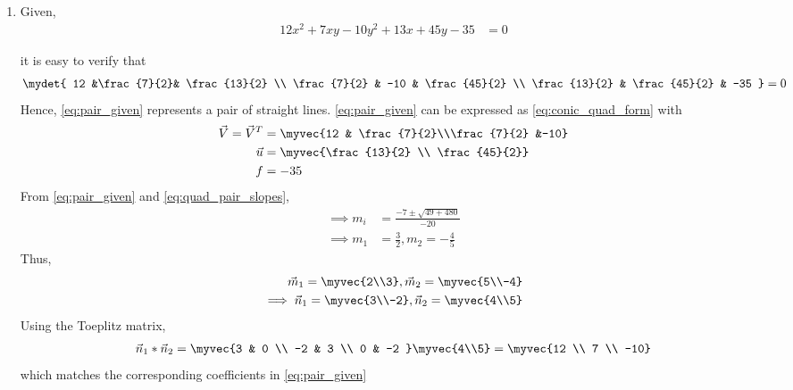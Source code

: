 \renewcommand{\theequation}{\theenumi}
\begin{enumerate}[label=\thesection.\arabic*.,ref=\thesection.\theenumi]

\item 
Given,
\begin{align}
    12x^2+7xy-10y^2+13x+45y-35&=0 
\label{eq:pair_given}
\end{align}

it is easy to verify that
\begin{align}
\mydet{
12 &\frac{7}{2}& \frac{13}{2}
\\
\frac{7}{2} & -10 & \frac{45}{2}
\\ 
\frac{13}{2} & \frac{45}{2} & -35
} = 0
\end{align}
%
Hence, \eqref{eq:pair_given} represents a pair of straight lines.
%
 \eqref{eq:pair_given} can be expressed as \eqref{eq:conic_quad_form} with
\begin{align}
    \vec{V}=\vec{V}^T&=\myvec{12 & \frac{7}{2}\\\frac{7}{2} &-10}\label{eq:pair_v}\\
    \vec{u}&=\myvec{\frac{13}{2} \\ \frac{45}{2}}\label{eq:pair_u}\\
    f&=-35\label{eq:pair_fv}
\end{align}
From \eqref{eq:pair_given} and \eqref{eq:quad_pair_slopes},
\begin{align}
\label{eq:quad_pair_slopes_ex}
\implies m_i &= \frac{-7 \pm \sqrt{49+480}}{-20}
\\
\implies m_1 &=  \frac{3}{2}, m_2 = -\frac{4}{5}
\end{align}
Thus,
\begin{align}
\vec{m}_1 = \myvec{2\\3},
\vec{m}_2 = \myvec{5\\-4}
\\
\implies
\vec{n}_1 = \myvec{3\\-2},
\vec{n}_2 = \myvec{4\\5}
\label{eq:quad_pair_norm_vec}
\end{align}
 Using the Toeplitz matrix,
\begin{align}
\vec{n}_1*\vec{n}_2 = 
\myvec{3 & 0
\\
-2 & 3
\\
0 & -2
}
\myvec{4\\5}
= \myvec{12 \\ 7 \\ -10}
\end{align}
%
which matches the corresponding coefficients in \eqref{eq:pair_given}


\end{enumerate}
